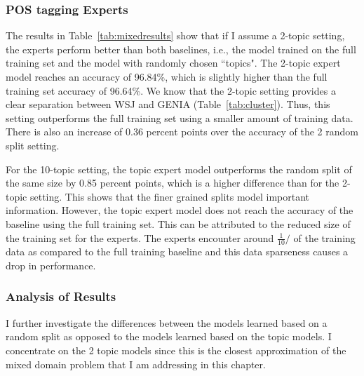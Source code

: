 \subsubsection{POS tagging Experts}

The results in Table~\ref{tab:mixedresults} show that if I assume a 2-topic setting, the experts perform better than both baselines, i.e., the model trained on the full training set and the model with randomly chosen ``topics". The 2-topic expert model reaches an accuracy of 96.84\%, which is slightly higher than the full training set accuracy of 96.64\%. We know that the 2-topic setting provides a clear separation between WSJ and GENIA (Table~\ref{tab:cluster}). Thus, this setting outperforms the full training set using a smaller amount of training data. There is also an increase of 0.36 percent points over the accuracy of the 2 random split setting. 

For the 10-topic setting, the topic expert model outperforms the random split of the same size by 0.85 percent points, which is a higher difference than for the 2-topic setting. This shows that the finer grained  splits model important information. However, the topic expert model does not reach the accuracy of the baseline using the full training set. This can be attributed to the reduced size of the training set for the experts. The experts encounter around $\frac{1}{10}/$ of the training data as compared to the full training baseline and this data sparseness causes a drop in performance.

\subsubsection{Analysis of Results}

I further investigate the differences between the models learned based on a random split as opposed to the models learned based on the topic models. I concentrate on the 2 topic models since this is the closest approximation of the mixed domain problem that I am addressing in this chapter.

